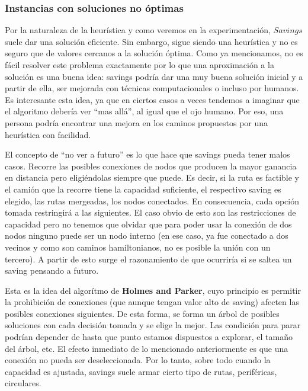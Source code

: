 \subsubsection{Instancias con soluciones no óptimas}
Por la naturaleza de la heurística y como veremos en la experimentación, $Savings$ suele dar una solución eficiente. Sin embargo, sigue siendo una heurística y no es seguro que de valores cercanos a la solución óptima. Como ya mencionamos, no es fácil resolver este problema exactamente por lo que una aproximación a la solución es una buena idea: savings podría dar una muy buena solución inicial y a partir de ella, ser mejorada con técnicas computacionales o incluso por humanos. Es interesante esta idea, ya que en ciertos casos a veces tendemos a imaginar que el algoritmo debería ver ``mas allá'', al igual que el ojo humano. Por eso, una persona podría encontrar una mejora en los caminos propuestos por una heurística con facilidad.
\par 
El concepto de ``no ver a futuro'' es lo que hace que savings pueda tener malos casos. Recorre las posibles conexiones de nodos que producen la mayor ganancia en distancia pero eligiéndolas siempre que puede. Es decir, si la ruta es factible y el camión que la recorre tiene la capacidad suficiente, el respectivo saving es elegido, las rutas mergeadas, los nodos conectados. En consecuencia, cada opción tomada restringirá a las siguientes. El caso obvio de esto son las restricciones de capacidad pero no tenemos que olvidar que para poder usar la conexión de dos nodos ninguno puede ser un nodo interno (en ese caso, ya fue conectado a dos vecinos y como son caminos hamiltonianos, no es posible la unión con un tercero). A partir de esto surge el razonamiento de que ocurriría si se saltea un saving pensando a futuro.  
\par 
Esta es la idea del algorítmo de \textbf{Holmes and Parker}, cuyo principio es permitir la prohibición de conexiones (que aunque tengan valor alto de saving) afecten las posibles conexiones siguientes. De esta forma, se forma un árbol de posibles soluciones con cada decisión tomada y se elige la mejor. Las condición para parar podrían depender de hasta que punto estamos dispuestos a explorar, el tamaño del árbol, etc.
El efecto inmediato de lo mencionado anteriormente es que una conexión no pueda ser deseleccionada. Por lo tanto, sobre todo cuando la capacidad es ajustada, savings suele armar cierto tipo de rutas, periféricas, circulares. 
\par 
